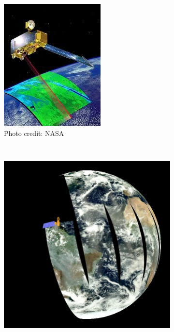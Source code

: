 \documentclass{article}
\begin{document}
\begin{figure}[!ht]
    \centering
    \begin{subfigure}[ht]{0.3\textwidth}
        \includegraphics[width=\textwidth]{MODISpic2.jpeg}
        \caption{Photo credit: NASA}
    \end{subfigure}
    ~ %
    \begin{subfigure}[ht]{0.37\textwidth}
        \includegraphics[width=\textwidth]{MODISpic1.jpg}

\end{subfigure}
\end{figure}
\end{document}
